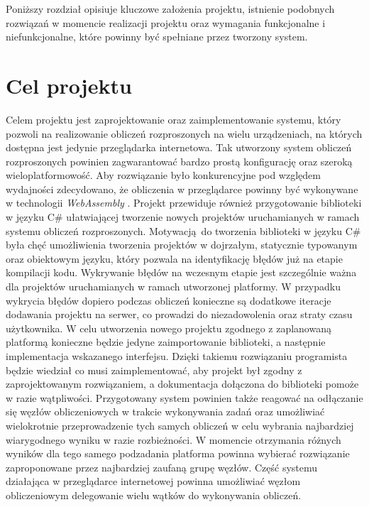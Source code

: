 \documentclass[a4paper,11pt,twoside]{report}
\theoremstyle{definition}
\begin{document}
    Poniższy rozdział opisiuje kluczowe założenia projektu, istnienie podobnych rozwiązań w momencie realizacji projektu oraz wymagania funkcjonalne i niefunkcjonalne, które powinny być spełniane przez tworzony system.

    \section{Cel projektu}
        Celem projektu jest zaprojektowanie oraz zaimplementowanie systemu, który pozwoli na realizowanie obliczeń rozproszonych na wielu urządzeniach, na których dostępna jest jedynie przeglądarka internetowa.
        Tak utworzony system obliczeń rozproszonych powinien zagwarantować bardzo prostą konfigurację oraz szeroką wieloplatformowość.
        Aby rozwiązanie było konkurencyjne pod względem wydajności zdecydowano, że obliczenia w przeglądarce powinny być wykonywane w technologii \textit{WebAssembly} \cite{webassembly}.
        Projekt przewiduje również przygotowanie biblioteki w języku C\# ułatwiającej tworzenie nowych projektów uruchamianych w ramach systemu obliczeń rozproszonych. 
        Motywacją do tworzenia biblioteki w języku C\# była chęć umożliwienia tworzenia projektów w dojrzałym, statycznie typowanym oraz obiektowym języku, który pozwala na identyfikację błędów już na etapie kompilacji kodu. 
        Wykrywanie błędów na wczesnym etapie jest szczególnie ważna dla projektów uruchamianych w ramach utworzonej platformy.
        W przypadku wykrycia błędów dopiero podczas obliczeń konieczne są dodatkowe iteracje dodawania projektu na serwer, co prowadzi do niezadowolenia oraz straty czasu użytkownika.
        W celu utworzenia nowego projektu zgodnego z zaplanowaną platformą konieczne będzie jedyne zaimportowanie biblioteki, a następnie implementacja wskazanego interfejsu.
        Dzięki takiemu rozwiązaniu programista będzie wiedział co musi zaimplementować, aby projekt był zgodny z zaprojektowanym rozwiązaniem, a dokumentacja dołączona do biblioteki pomoże w razie wątpliwości.
        Przygotowany system powinien także reagować na odłączanie się węzłów obliczeniowych w trakcie wykonywania zadań oraz umożliwiać wielokrotnie przeprowadzenie tych samych obliczeń w celu wybrania najbardziej wiarygodnego wyniku w razie rozbieżności.
        W momencie otrzymania różnych wyników dla tego samego podzadania platforma powinna wybierać rozwiązanie zaproponowane przez najbardziej zaufaną grupę węzłów.
        Część systemu działająca w przeglądarce internetowej powinna umożliwiać węzłom obliczeniowym delegowanie wielu wątków do wykonywania obliczeń.
    
\end{document}
